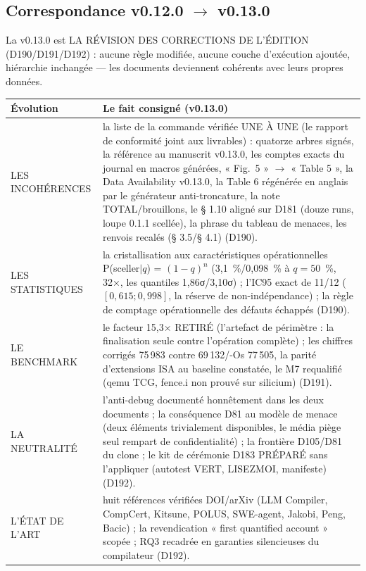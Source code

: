 \subsection{Correspondance v0.12.0 $\to$ v0.13.0}\label{sec:evolutions130}

La v0.13.0 est LA RÉVISION DES CORRECTIONS DE L'ÉDITION (D190/D191/D192) :
aucune règle modifiée, aucune couche d'exécution ajoutée, hiérarchie
inchangée — les documents deviennent cohérents avec leurs propres données.

\begin{table}[tbp]
\centering
\small
\begin{tabularx}{\textwidth}{>{\raggedright\arraybackslash}p{3.4cm} X}
\textbf{Évolution} & \textbf{Le fait consigné (v0.13.0)} \\
\midrule
LES INCOHÉRENCES & la liste de la commande vérifiée UNE À UNE (le rapport
de conformité joint aux livrables) : quatorze arbres signés, la référence au
manuscrit v0.13.0, les comptes exacts du journal en macros générées,
« Fig.~5 » $\to$ « Table 5 », la Data Availability v0.13.0, la Table 6
régénérée en anglais par le générateur anti-troncature, la note
TOTAL/brouillons, le § 1.10 aligné sur D181 (douze runs, loupe 0.1.1
scellée), la phrase du tableau de menaces, les renvois recalés (§ 3.5/§ 4.1)
(D190). \\
LES STATISTIQUES & la cristallisation aux caractéristiques opérationnelles
P(sceller$|q$) = $(1-q)^n$ (3,1~\%/0,098~\% à $q = 50$~\%, 32×, les
quantiles 1,86σ/3,10σ) ; l'IC95 exact de 11/12 ($[0,615 ; 0,998]$, la
réserve de non-indépendance) ; la règle de comptage opérationnelle des
défauts échappés (D190). \\
LE BENCHMARK & le facteur 15,3× RETIRÉ (l'artefact de périmètre : la
finalisation seule contre l'opération complète) ; les chiffres corrigés
75\,983 contre 69\,132/-Os 77\,505, la parité d'extensions ISA au baseline
constatée, le M7 requalifié (qemu TCG, fence.i non prouvé sur silicium)
(D191). \\
LA NEUTRALITÉ & l'anti-debug documenté honnêtement dans les deux documents ;
la conséquence D81 au modèle de menace (deux éléments trivialement
disponibles, le média piège seul rempart de confidentialité) ; la frontière
D105/D81 du clone ; le kit de cérémonie D183 PRÉPARÉ sans l'appliquer
(autotest VERT, LISEZMOI, manifeste) (D192). \\
L'ÉTAT DE L'ART & huit références vérifiées DOI/arXiv (LLM Compiler,
CompCert, Kitsune, POLUS, SWE-agent, Jakobi, Peng, Bacic) ; la revendication
« first quantified account » scopée ; RQ3 recadrée en garanties
silencieuses du compilateur (D192). \\
\end{tabularx}
\end{table}

